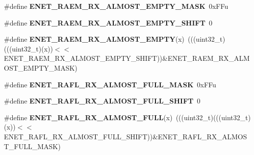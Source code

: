 \begin{DoxyCompactItemize}
\item 
\#define {\bfseries E\+N\+E\+T\+\_\+\+R\+A\+E\+M\+\_\+\+R\+X\+\_\+\+A\+L\+M\+O\+S\+T\+\_\+\+E\+M\+P\+T\+Y\+\_\+\+M\+A\+SK}~0x\+F\+Fu\hypertarget{group__ENET__Register__Masks_ga37982efb14bcd40ca10c696e7368dce2}{}\label{group__ENET__Register__Masks_ga37982efb14bcd40ca10c696e7368dce2}

\item 
\#define {\bfseries E\+N\+E\+T\+\_\+\+R\+A\+E\+M\+\_\+\+R\+X\+\_\+\+A\+L\+M\+O\+S\+T\+\_\+\+E\+M\+P\+T\+Y\+\_\+\+S\+H\+I\+FT}~0\hypertarget{group__ENET__Register__Masks_gad89e89d3db86bdebd82cba2f2994e4df}{}\label{group__ENET__Register__Masks_gad89e89d3db86bdebd82cba2f2994e4df}

\item 
\#define {\bfseries E\+N\+E\+T\+\_\+\+R\+A\+E\+M\+\_\+\+R\+X\+\_\+\+A\+L\+M\+O\+S\+T\+\_\+\+E\+M\+P\+TY}(x)~(((uint32\+\_\+t)(((uint32\+\_\+t)(x))$<$$<$E\+N\+E\+T\+\_\+\+R\+A\+E\+M\+\_\+\+R\+X\+\_\+\+A\+L\+M\+O\+S\+T\+\_\+\+E\+M\+P\+T\+Y\+\_\+\+S\+H\+I\+FT))\&E\+N\+E\+T\+\_\+\+R\+A\+E\+M\+\_\+\+R\+X\+\_\+\+A\+L\+M\+O\+S\+T\+\_\+\+E\+M\+P\+T\+Y\+\_\+\+M\+A\+SK)\hypertarget{group__ENET__Register__Masks_gaf15ad096303b974696f055666297cf38}{}\label{group__ENET__Register__Masks_gaf15ad096303b974696f055666297cf38}

\item 
\#define {\bfseries E\+N\+E\+T\+\_\+\+R\+A\+F\+L\+\_\+\+R\+X\+\_\+\+A\+L\+M\+O\+S\+T\+\_\+\+F\+U\+L\+L\+\_\+\+M\+A\+SK}~0x\+F\+Fu\hypertarget{group__ENET__Register__Masks_ga3b79bb95900a65117a1e64a98e0ca741}{}\label{group__ENET__Register__Masks_ga3b79bb95900a65117a1e64a98e0ca741}

\item 
\#define {\bfseries E\+N\+E\+T\+\_\+\+R\+A\+F\+L\+\_\+\+R\+X\+\_\+\+A\+L\+M\+O\+S\+T\+\_\+\+F\+U\+L\+L\+\_\+\+S\+H\+I\+FT}~0\hypertarget{group__ENET__Register__Masks_ga3b190ba30467b67b3d17589f3f193475}{}\label{group__ENET__Register__Masks_ga3b190ba30467b67b3d17589f3f193475}

\item 
\#define {\bfseries E\+N\+E\+T\+\_\+\+R\+A\+F\+L\+\_\+\+R\+X\+\_\+\+A\+L\+M\+O\+S\+T\+\_\+\+F\+U\+LL}(x)~(((uint32\+\_\+t)(((uint32\+\_\+t)(x))$<$$<$E\+N\+E\+T\+\_\+\+R\+A\+F\+L\+\_\+\+R\+X\+\_\+\+A\+L\+M\+O\+S\+T\+\_\+\+F\+U\+L\+L\+\_\+\+S\+H\+I\+FT))\&E\+N\+E\+T\+\_\+\+R\+A\+F\+L\+\_\+\+R\+X\+\_\+\+A\+L\+M\+O\+S\+T\+\_\+\+F\+U\+L\+L\+\_\+\+M\+A\+SK)\hypertarget{group__ENET__Register__Masks_gab63ee8b6dcb24483573b2ef4d95c09e9}{}\label{group__ENET__Register__Masks_gab63ee8b6dcb24483573b2ef4d95c09e9}


\end{DoxyCompactItemize}
